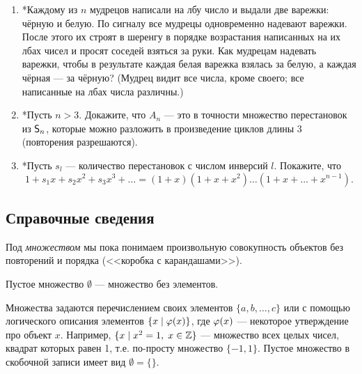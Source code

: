 \begin{enumerate}
\item *Каждому из $n$ мудрецов написали на лбу число и выдали две варежки: чёрную и белую. По сигналу
 все мудрецы одновременно надевают варежки. После этого их строят в шеренгу в порядке возрастания
написанных на их лбах чисел и просят соседей взяться за руки. Как мудрецам надевать варежки, чтобы
в результате каждая белая варежка взялась за белую, а каждая чёрная --- за чёрную? (Мудрец видит все
числа, кроме своего; все написанные на лбах числа различны.)

\item *Пусть $n > 3$. Докажите, что $A_n$ --- это в точности множество перестановок из ${\mathsf{S}}_n$,
которые можно разложить в произведение циклов длины 3 (повторения разрешаются).

\item *Пусть $s_l$ --- количество перестановок с числом инверсий $l$. Покажите, что
$$
1 + s_1 x + s_2 x^2 + s_3x^3 + \dots = (1 + x)(1 + x + x^2 ) \dots (1 + x + . . . + x^{n-1} ).
$$

\end{enumerate}

\subsection*{Справочные сведения}

Под \textit{множеством} мы пока понимаем произвольную совокупность объектов без повторений и порядка (<<коробка с карандашами>>).

Пустое множество $\emptyset$ --- множество без элементов.

Множества задаются перечислением своих элементов $\{a,b,\dots,c\}$ или с помощью логического описания элементов $\{x\mid \varphi(x)\}$, где $\varphi(x)$ --- некоторое утверждение про объект $x$. Например, $\{x\mid x^2=1, \; x\in\mathbb Z\}$ --- множество всех целых чисел, квадрат которых равен 1, т.е. по-просту множество $\{-1,1\}$. Пустое множество в скобочной записи имеет вид $\emptyset=\{\}$.

